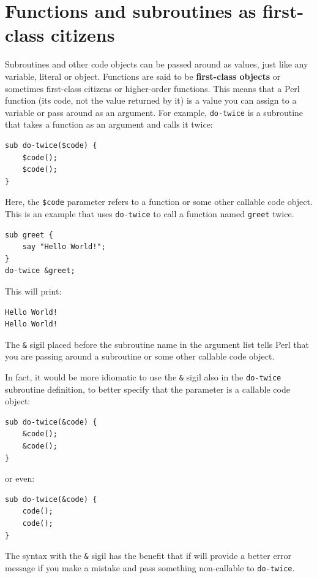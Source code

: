 \section{Functions and subroutines as first-class citizens}
\label{first_class}

Subroutines and other code objects can be passed around as values, 
just like any variable, literal or object. Functions are said 
to be {\bf first-class objects} or sometimes first-class 
citizens or higher-order functions. This means that a Perl 
function (its code, not the value returned by it) is a value 
you can assign to a variable or pass around as an argument. 
For example, \verb"do-twice" is a subroutine that takes a 
function as an argument and calls it twice:

\begin{verbatim}
sub do-twice($code) {
    $code(); 
    $code();
}
\end{verbatim}

Here, the \verb"$code" parameter refers to a function or some
other callable code object. This is an example that uses
\verb"do-twice" to call a function named \verb"greet" twice.

\begin{verbatim}
sub greet {
    say "Hello World!";
}
do-twice &greet;
\end{verbatim}

This will print:
\begin{verbatim}
Hello World!
Hello World!
\end{verbatim}

The \verb"&" sigil placed before the subroutine name in the 
argument list tells Perl that you are passing around a 
subroutine or some other callable code object.

In fact, it would be more idiomatic to use the \verb"&" sigil 
also in the \verb"do-twice" subroutine definition, to better 
specify that the parameter is a callable code object:

\begin{verbatim}
sub do-twice(&code) {
    &code(); 
    &code();
}
\end{verbatim}

or even:
\begin{verbatim}
sub do-twice(&code) {
    code(); 
    code();
}
\end{verbatim}

The syntax with the \verb"&" sigil has the benefit that 
if will provide a better error message if you make a mistake 
and pass something non-callable to \verb"do-twice". 

